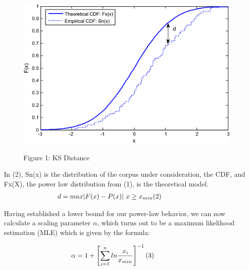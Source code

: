 \documentclass[12pt]{article}
\begin{document}
\begin{figure}[h!]
\centering
  \includegraphics[scale=.75]{ks_test.png}\\
  \caption{Figure 1: KS Distance}
\end{figure}

\begin{center}
\setlength{\abovedisplayskip}{1pt}
\setlength{\belowdisplayskip}{1pt}
\end{center}  

In (2), Sn(x) is the distribution of the corpus under consideration, the CDF, and Fx(X), the power law distribution from (1), is the theoretical model.
\begin{equation*}
\begin{aligned}
d &= max|F(x)-P(x)|\ x\geq x_{min}\hspace{4em (2)}
\end{aligned}
\end{equation*} 

Having established a lower bound for our power-law behavior, we can now calculate a scaling parameter $\alpha$, which turns out to be a  maximum likelihood estimation (MLE) which is given by the formula:

\begin{equation*}
\begin{aligned}
\alpha = 1 +\left[ \sum_{i=1}^{n}ln\frac{x_i}{x_{min}}\right]^{-1}\hspace{4em (3)}
\end{aligned}
\end{equation*} 
\end{document}
